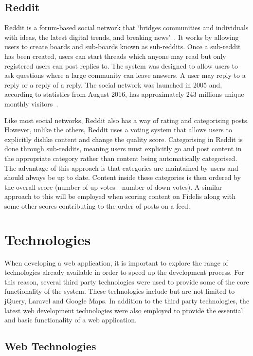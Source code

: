 \subsection{Reddit}
Reddit is a forum-based social network that `bridges communities and individuals with ideas, the latest digital trends, and breaking news'~\cite{Reddit:About}. It works by allowing users to create boards and sub-boards known as sub-reddits. Once a sub-reddit has been created, users can start threads which anyone may read but only registered users can post replies to. The system was designed to allow users to ask questions where a large community can leave answers. A user may reply to a reply or a reply of a reply. The social network was launched in 2005 and, according to statistics from August 2016, has approximately 243 millions unique monthly visitors~\cite{Statista:Reddit}.

Like most social networks, Reddit also has a way of rating and categorising posts. However, unlike the others, Reddit uses a voting system that allows users to explicitly dislike content and change the quality score. Categorising in Reddit is done through sub-reddits, meaning users must explicitly go and post content in the appropriate category rather than content being automatically categorised. The advantage of this approach is that categories are maintained by users and should always be up to date. Content inside these categories is then ordered by the overall score (number of up votes - number of down votes). A similar approach to this will be employed when scoring content on Fidelis along with some other scores contributing to the order of posts on a feed.

\section{Technologies}
\label{Section:Technologies}
When developing a web application, it is important to explore the range of technologies already available in order to speed up the development process. For this reason, several third party technologies were used to provide some of the core functionality of the system. These technologies include but are not limited to jQuery, Laravel and Google Maps. In addition to the third party technologies, the latest web development technologies were also employed to provide the essential and basic functionality of a web application.

\subsection{Web Technologies} \label{Section:Web_Technologies}

